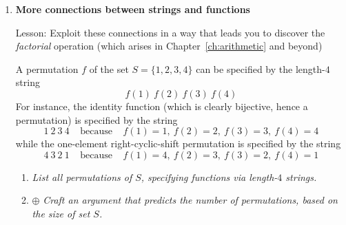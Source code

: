 {\begin{enumerate}
\begin{enumerate}
  \medskip\item
{\em Prove that $h(x)$ is a {\em surjection} from $\N^+$ to $\N^+$.}

  \medskip\item
{\em Prove that the preceding assertions are as strong as possible, in the sense that:}
    \begin{enumerate}
    \item
{\em Neither $f(x)$ nor $g(x)$ is a {\em surjection} from $\N^+$ to $\N^+$.}
    \medskip\item
{\em $h(x)$ is not an {\em injection} from $\N^+$ to $\N^+$.}
    \end{enumerate}
      
  \medskip\item {}
{\em Prove that $h(x)$ is a ``post-inverse" to both $f(x)$ and $g(x)$, in the sense that applying $h$ ``undoes" an earlier application of either $f$ or $g$.  In detail, for all $x \in \N^+$:
\[ h(f(x)) \ \ = \ \ h(g(x)) \ \ = \ \ x \]
In other words, both $f \circ h$ and $g \circ h$ are the identity function on $\N^+$. }
  \end{enumerate}

\medskip\item
{\bf More connections between strings and functions}

{\sc Lesson:} Exploit these connections in a way that leads you to discover the {\em factorial} operation (which arises in Chapter~\ref{ch:arithmetic} and beyond)

\smallskip

A permutation $f$ of the set $S = \{1,2,3,4\}$ can be specified by the length-$4$ string
\[ f(1) \ f(2) \ f(3) \ f(4) \]
For instance, the identity function (which is clearly bijective, hence a permutation) is specified by the string
\[ 1 \ 2 \ 3 \ 4 \ \ \ \ \ \mbox{because} \ \ \ \ \ f(1)=1, \ f(2)=2, \ f(3) =3, \ f(4)=4 \]
while the one-element right-cyclic-shift permutation is specified by the string
\[ 4 \ 3 \ 2 \ 1 \ \ \ \ \ \mbox{because} \ \ \ \ \ f(1)=4, \ f(2)=3, \ f(3) =2, \ f(4)=1\]
  \begin{enumerate}
  \item
{\em List all permutations of $S$, specifying functions via length-$4$ strings.}
  \medskip\item
$\oplus$
{\em Craft an argument that predicts the number of permutations, based on the size of set $S$.}

\smallskip


\end{enumerate}
\end{enumerate}}
